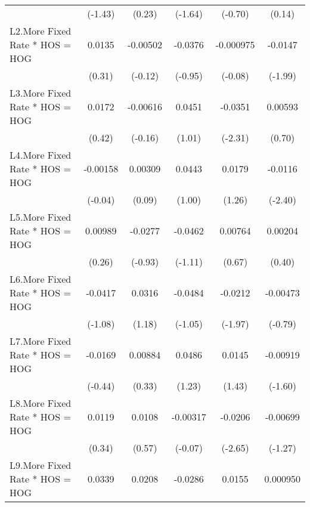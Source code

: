 {\begin{longtable}{l*{5}{c}}
                &  (-1.43)         &   (0.23)         &  (-1.64)         &  (-0.70)         &   (0.14)         \\
\addlinespace
L2.More Fixed Rate * HOS = HOG&   0.0135         & -0.00502         &  -0.0376         &-0.000975         &  -0.0147\sym{*}  \\
                &   (0.31)         &  (-0.12)         &  (-0.95)         &  (-0.08)         &  (-1.99)         \\
\addlinespace
L3.More Fixed Rate * HOS = HOG&   0.0172         & -0.00616         &   0.0451         &  -0.0351\sym{*}  &  0.00593         \\
                &   (0.42)         &  (-0.16)         &   (1.01)         &  (-2.31)         &   (0.70)         \\
\addlinespace
L4.More Fixed Rate * HOS = HOG& -0.00158         &  0.00309         &   0.0443         &   0.0179         &  -0.0116\sym{*}  \\
                &  (-0.04)         &   (0.09)         &   (1.00)         &   (1.26)         &  (-2.40)         \\
\addlinespace
L5.More Fixed Rate * HOS = HOG&  0.00989         &  -0.0277         &  -0.0462         &  0.00764         &  0.00204         \\
                &   (0.26)         &  (-0.93)         &  (-1.11)         &   (0.67)         &   (0.40)         \\
\addlinespace
L6.More Fixed Rate * HOS = HOG&  -0.0417         &   0.0316         &  -0.0484         &  -0.0212         & -0.00473         \\
                &  (-1.08)         &   (1.18)         &  (-1.05)         &  (-1.97)         &  (-0.79)         \\
\addlinespace
L7.More Fixed Rate * HOS = HOG&  -0.0169         &  0.00884         &   0.0486         &   0.0145         & -0.00919         \\
                &  (-0.44)         &   (0.33)         &   (1.23)         &   (1.43)         &  (-1.60)         \\
\addlinespace
L8.More Fixed Rate * HOS = HOG&   0.0119         &   0.0108         & -0.00317         &  -0.0206\sym{**} & -0.00699         \\
                &   (0.34)         &   (0.57)         &  (-0.07)         &  (-2.65)         &  (-1.27)         \\
\addlinespace
L9.More Fixed Rate * HOS = HOG&   0.0339         &   0.0208         &  -0.0286         &   0.0155         & 0.000950         \\

\end{longtable}}
